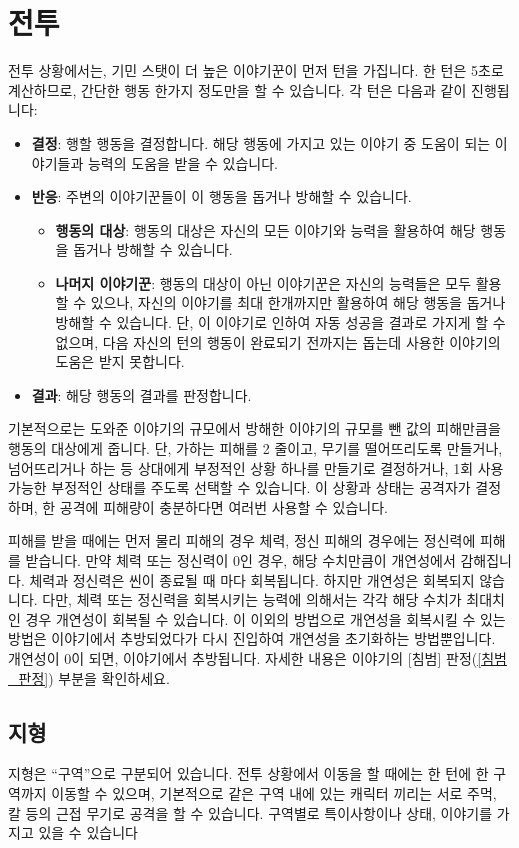 \documentclass[12pt]{report}
\begin{document}
	\chapter{전투}
	전투 상황에서는, 기민 스탯이 더 높은 이야기꾼이 먼저 턴을 가집니다. 한 턴은 5초로 계산하므로, 간단한 행동 한가지 정도만을 할 수 있습니다. 각 턴은 다음과 같이 진행됩니다:
	\begin{itemize}
		\item \textbf{결정}: 행할 행동을 결정합니다. 해당 행동에 가지고 있는 이야기 중 도움이 되는 이야기들과 능력의 도움을 받을 수 있습니다.
		\item \textbf{반응}: 주변의 이야기꾼들이 이 행동을 돕거나 방해할 수 있습니다.
		\begin{itemize}
			\item \textbf{행동의 대상}: 행동의 대상은 자신의 모든 이야기와 능력을 활용하여 해당 행동을 돕거나 방해할 수 있습니다.
			\item \textbf{나머지 이야기꾼}: 행동의 대상이 아닌 이야기꾼은 자신의 능력들은 모두 활용할 수 있으나, 자신의 이야기를 최대 한개까지만 활용하여 해당 행동을 돕거나 방해할 수 있습니다. 단, 이 이야기로 인하여 자동 성공을 결과로 가지게 할 수 없으며, 다음 자신의 턴의 행동이 완료되기 전까지는 돕는데 사용한 이야기의 도움은 받지 못합니다.
		\end{itemize}
		\item \textbf{결과}: 해당 행동의 결과를 판정합니다.
	\end{itemize}
	기본적으로는 도와준 이야기의 규모에서 방해한 이야기의 규모를 뺀 값의 피해만큼을 행동의 대상에게 줍니다. 단, 가하는 피해를 2 줄이고, 무기를 떨어뜨리도록 만들거나, 넘어뜨리거나 하는 등 상대에게 부정적인 상황 하나를 만들기로 결정하거나, 1회 사용 가능한 부정적인 상태를 주도록 선택할 수 있습니다. 이 상황과 상태는 공격자가 결정하며, 한 공격에 피해량이 충분하다면 여러번 사용할 수 있습니다.
	
	피해를 받을 때에는 먼저 물리 피해의 경우 체력, 정신 피해의 경우에는 정신력에 피해를 받습니다. 만약 체력 또는 정신력이 0인 경우, 해당 수치만큼이 개연성에서 감해집니다.
	체력과 정신력은 씬이 종료될 때 마다 회복됩니다. 하지만 개연성은 회복되지 않습니다. 다만, 체력 또는 정신력을 회복시키는 능력에 의해서는 각각 해당 수치가 최대치인 경우 개연성이 회복될 수 있습니다. 이 이외의 방법으로 개연성을 회복시킬 수 있는 방법은 이야기에서 추방되었다가 다시 진입하여 개연성을 초기화하는 방법뿐입니다.
	개연성이 0이 되면, 이야기에서 추방됩니다. 자세한 내용은 이야기의 [침범] 판정(\ref{침범_판정}) 부분을 확인하세요.
	
	\section*{지형}
	지형은 “구역”으로 구분되어 있습니다. 전투 상황에서 이동을 할 때에는 한 턴에 한 구역까지 이동할 수 있으며, 기본적으로 같은 구역 내에 있는 캐릭터 끼리는 서로 주먹, 칼 등의 근접 무기로 공격을 할 수 있습니다. 구역별로 특이사항이나 상태, 이야기를 가지고 있을 수 있습니다
	
\end{document}
